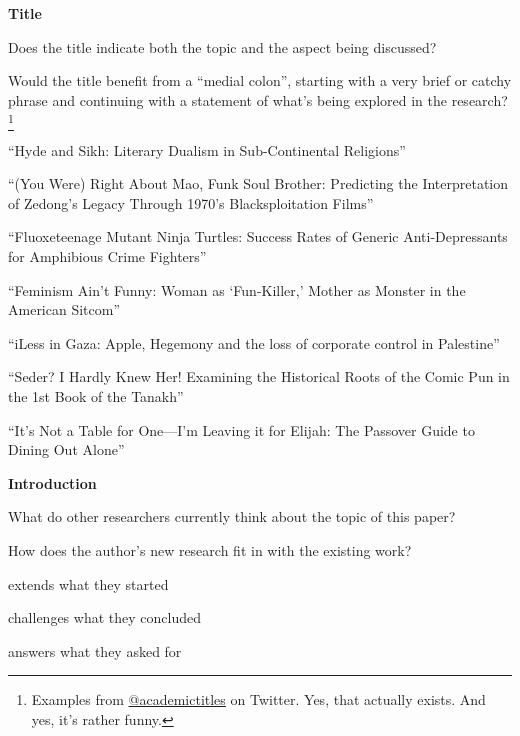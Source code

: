 \documentclass[10pt,article,oneside]{memoir}
\begin{document}
\begin{multicols}{2}
\begin{compactitem}
	\item \textbf{Title}
	\begin{compactitem}
		\item Does the title indicate both the topic and the aspect being discussed?
		\item Would the title benefit from a ``medial colon'', starting with a very brief or catchy phrase and continuing with a statement of what's being explored in the research?\footnote{Examples from \href{https://twitter.com/academictitles}{@academictitles} on Twitter. Yes, that actually exists. And yes, it's rather funny.}
		\begin{compactitem}
			\item ``Hyde and Sikh: Literary Dualism in Sub-Continental Religions''
			\item ``(You Were) Right About Mao, Funk Soul Brother: Predicting the Interpretation of Zedong's Legacy Through 1970's Blacksploitation Films''
			\item ``Fluoxeteenage Mutant Ninja Turtles: Success Rates of Generic Anti-Depressants for Amphibious Crime Fighters''
			\item ``Feminism Ain't Funny: Woman as `Fun-Killer,' Mother as Monster in the American Sitcom''
			\item ``iLess in Gaza: Apple, Hegemony and the loss of corporate control in Palestine''
			\item ``Seder? I Hardly Knew Her! Examining the Historical Roots of the Comic Pun in the 1st Book of the Tanakh''
			\item ``It's Not a Table for One---I'm Leaving it for Elijah: The Passover Guide to Dining Out Alone''
		\end{compactitem}
	\end{compactitem}
	\item \textbf{Introduction}
	\begin{compactitem}
		\item What do other researchers currently think about the topic of this paper?
		\item How does the author's new research fit in with the existing work?
		\begin{compactitem}
			\item extends what they started
			\item challenges what they concluded
			\item answers what they asked for

\end{compactitem}
\end{compactitem}
\end{compactitem}
\end{multicols}
\end{document}
